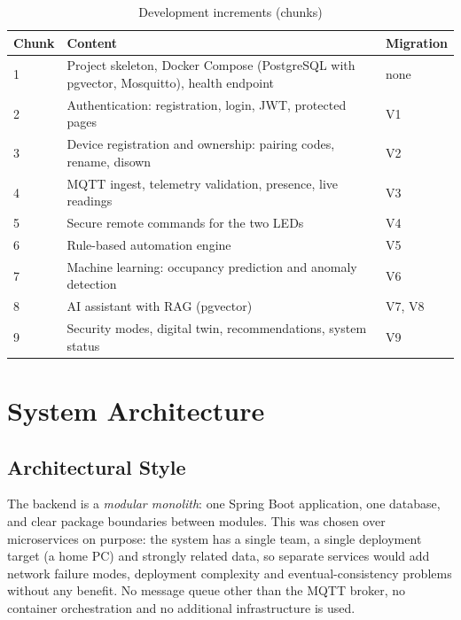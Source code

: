 \documentclass[12pt,a4paper,oneside]{report}
\begin{document}
\begin{table}[H]
\centering
\caption{Development increments (chunks)}
\label{tab:chunks}
\begin{tabularx}{\textwidth}{lXl}
\toprule
\textbf{Chunk} & \textbf{Content} & \textbf{Migration}\\
\midrule
1 & Project skeleton, Docker Compose (PostgreSQL with pgvector, Mosquitto), health endpoint & none\\
2 & Authentication: registration, login, JWT, protected pages & V1\\
3 & Device registration and ownership: pairing codes, rename, disown & V2\\
4 & MQTT ingest, telemetry validation, presence, live readings & V3\\
5 & Secure remote commands for the two LEDs & V4\\
6 & Rule-based automation engine & V5\\
7 & Machine learning: occupancy prediction and anomaly detection & V6\\
8 & AI assistant with RAG (pgvector) & V7, V8\\
9 & Security modes, digital twin, recommendations, system status & V9\\
\bottomrule
\end{tabularx}
\end{table}

\chapter{System Architecture}
\label{ch:architecture}

\section{Architectural Style}
The backend is a \emph{modular monolith}: one Spring Boot application, one database, and clear package boundaries between modules. This was chosen over microservices on purpose: the system has a single team, a single deployment target (a home PC) and strongly related data, so separate services would add network failure modes, deployment complexity and eventual-consistency problems without any benefit. No message queue other than the MQTT broker, no container orchestration and no additional infrastructure is used.
\end{document}
